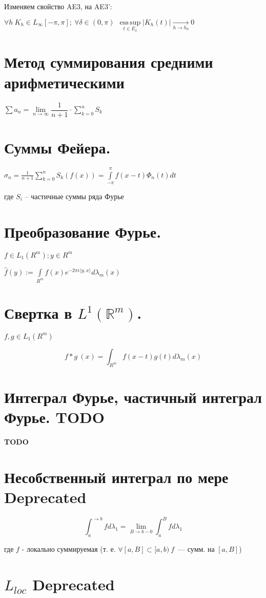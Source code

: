 \documentclass[paper=a4, fontsize=17pt]{article}
\DeclareMathOperator*{\esssup}{ess\, sup}
\begin{document}
	Изменяем свойство AE3, на AE3': 
	
	$ \forall h ~ K_h \in L_\infty[-\pi, \pi]; ~ \forall \delta \in (0, \pi) ~ ~ \esssup\limits_{t \in E_\delta} |K_h(t)| \underset{h \rightarrow h_0}{\rightarrow} 0 $
	
\section{Метод суммирования средними арифметическими}
	$\sum a_n = \lim\limits_{n \to \infty} \dfrac{1}{n+1} \cdot \sum\limits_{k=0}^n S_k$
\section{Суммы Фейера.}
	$ \sigma_n = \frac{1}{n + 1} \sum\limits_{k=0}^{n} S_k(f(x)) = \int\limits_{-\pi}^{\pi} f(x - t) \Phi_n(t) dt$
	
	где $ S_i $ -- частичные суммы ряда Фурье
\section{Преобразование Фурье.}
	$ f \in L_1(R^m); y \in R^m$
	
	$  \hat{f}(y) := \int\limits_{R^m} f(x)e^{-2\pi i \langle y, x \rangle} d\lambda_m(x) $
\section{Свертка в $L^1(\mathds{R}^m)$.}
	
	$ f, g \in L_1(R^m) $
	
	$$ f \ast g ~ (x) = \int_{R^m} f(x - t) g(t) d\lambda_m(x)$$
	
\section{Интеграл Фурье, частичный интеграл Фурье. TODO}
	{\color{red} \textbf{TODO}}


	\section{Несобственный интеграл по мере \Large Deprecated}

	$$ \int_{a}^{\rightarrow b} f d\lambda_1 = \lim\limits_{B \rightarrow b-0} \int_{a}^{B} f d\lambda_1 $$

	где $ f $ - локально суммируемая (т. е. $ \forall [a, B] \subset [a, b) ~ f $~--- сумм. на $ [a, B] $)

	\section{$ L_{loc} $ \Large Deprecated}
\end{document}
